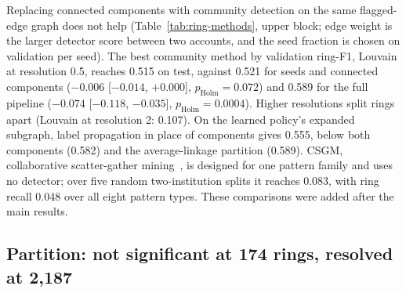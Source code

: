 Replacing connected components with community detection on the same flagged-edge graph does
not help (Table~\ref{tab:ring-methods}, upper block; edge weight is the larger detector score
between two accounts, and the seed fraction is chosen on validation per seed). The best
community method by validation ring-F1, Louvain at resolution 0.5, reaches 0.515 on test,
against 0.521 for seeds and connected components ($-0.006$ [$-0.014$, $+0.000$],
$p_{\mathrm{Holm}}=0.072$) and 0.589 for the full pipeline ($-0.074$ [$-0.118$, $-0.035$],
$p_{\mathrm{Holm}}=0.0004$). Higher resolutions split rings apart (Louvain at resolution 2:
0.107). On the learned policy's expanded subgraph, label propagation in place of components
gives 0.555, below both components (0.582) and the average-linkage partition (0.589). CSGM,
collaborative scatter-gather mining~\citep{tian2025}, is designed for one pattern family and
uses no detector; over five random two-institution splits it reaches 0.083, with ring recall
0.048 over all eight pattern types. These comparisons were added after the main results.

\subsection{Partition: not significant at 174 rings, resolved at 2{,}187}
\label{sec:results-partition}

